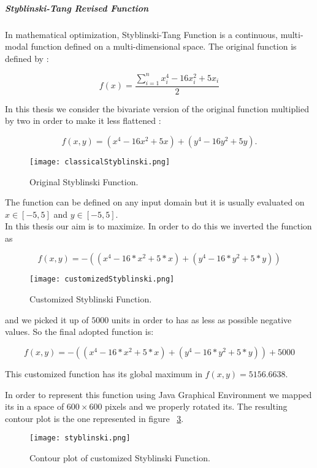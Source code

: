 \subparagraph{Styblinski-Tang Revised Function} In mathematical optimization, Styblinski-Tang Function is a continuous, multi-modal function defined on a multi-dimensional space. The original function is defined by :

\begin{equation}
	f(x) = \dfrac{\sum_{i=1}^{n} x_{i}^4 -16x_{i}^2 +5x_{i}}{2}
\end{equation}

In this thesis we consider the bivariate version of the original function multiplied by two in order to make it less flattened :

\begin{equation}
f(x, y) = (x^4 - 16x^2 + 5x) + (y^4 - 16y^2 + 5y).
\end{equation}

\begin{figure}[h!]
	\centering
	\texttt{[image: classicalStyblinski.png]}
	\caption{Original Styblinski Function.}
	\label{fig:OriginalStyblinskiFunction}
\end{figure}

The function can be defined on any input domain but it is usually evaluated on $x \in [-5, 5]$ and $y \in [-5, 5]$. \\

In this thesis our aim is to maximize. In order to do this we inverted the function as

\begin{equation}
f(x, y) = -((x^4 - 16 * x^2 + 5 * x) + (y^4 - 16 * y^2 + 5 * y))
\end{equation}

\begin{figure}[h!]
	\centering
	\texttt{[image: customizedStyblinski.png]}
	\caption{Customized Styblinski Function.}
	\label{fig:CustomizedStyblinskiFunction}
\end{figure}

and we picked it up of $5000$ units in order to has as less as possible negative values. So the final adopted function is: 

\begin{equation}
f(x, y) = -((x^4 - 16 * x^2 + 5 * x) + (y^4 - 16 * y^2 + 5 * y)) + 5000
\end{equation}

This customized function has its global maximum in $f(x, y) = 5156.6638$.

In order to represent this function using Java Graphical Environment we mapped its in a space of $600 \times 600$ pixels and we properly rotated its. The resulting contour plot is the one represented in figure ~\ref{fig:ContourStyblinskiFunction}.

\begin{figure}[h!]
	\centering
	\texttt{[image: styblinski.png]}
	\caption{Contour plot of customized Styblinski Function.}
	\label{fig:ContourStyblinskiFunction}
\end{figure}






